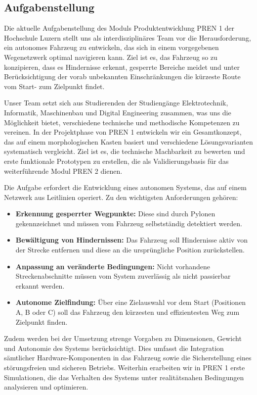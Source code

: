 \documentclass[main.tex]{subfiles} %
\begin{document}

\subsection{Aufgabenstellung}

Die aktuelle Aufgabenstellung des Moduls Produktentwicklung PREN 1 der Hochschule Luzern stellt uns als interdisziplinäres Team vor die Herausforderung, ein autonomes Fahrzeug zu entwickeln, das sich in einem vorgegebenen Wegenetzwerk optimal navigieren kann. Ziel ist es, das Fahrzeug so zu konzipieren, dass es Hindernisse erkennt, gesperrte Bereiche meidet und unter Berücksichtigung der vorab unbekannten Einschränkungen die kürzeste Route vom Start- zum Zielpunkt findet.

Unser Team setzt sich aus Studierenden der Studiengänge Elektrotechnik, Informatik, Maschinenbau und Digital Engineering zusammen, was uns die Möglichkeit bietet, verschiedene technische und methodische Kompetenzen zu vereinen. In der Projektphase von PREN 1 entwickeln wir ein Gesamtkonzept, das auf einem morphologischen Kasten basiert und verschiedene Lösungsvarianten systematisch vergleicht. Ziel ist es, die technische Machbarkeit zu bewerten und erste funktionale Prototypen zu erstellen, die als Validierungsbasis für das weiterführende Modul PREN 2 dienen.

Die Aufgabe erfordert die Entwicklung eines autonomen Systems, das auf einem Netzwerk aus Leitlinien operiert. Zu den wichtigsten Anforderungen gehören:
\begin{itemize}
    \item \textbf{Erkennung gesperrter Wegpunkte:} Diese sind durch Pylonen gekennzeichnet und müssen vom Fahrzeug selbstständig detektiert werden.
    \item \textbf{Bewältigung von Hindernissen:} Das Fahrzeug soll Hindernisse aktiv von der Strecke entfernen und diese an die ursprüngliche Position zurückstellen.
    \item \textbf{Anpassung an veränderte Bedingungen:} Nicht vorhandene Streckenabschnitte müssen vom System zuverlässig als nicht passierbar erkannt werden.
    \item \textbf{Autonome Zielfindung:} Über eine Zielauswahl vor dem Start (Positionen A, B oder C) soll das Fahrzeug den kürzesten und effizientesten Weg zum Zielpunkt finden.
\end{itemize}

Zudem werden bei der Umsetzung strenge Vorgaben zu Dimensionen, Gewicht und Autonomie des Systems berücksichtigt. Dies umfasst die Integration sämtlicher Hardware-Komponenten in das Fahrzeug sowie die Sicherstellung eines störungsfreien und sicheren Betriebs. Weiterhin erarbeiten wir in PREN 1 erste Simulationen, die das Verhalten des Systems unter realitätsnahen Bedingungen analysieren und optimieren.
\end{document}
